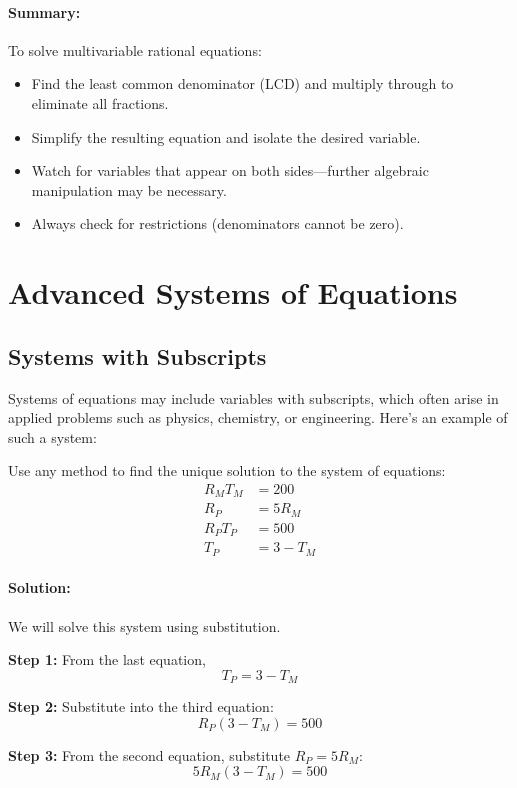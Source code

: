 \documentclass[11pt]{article}
\begin{document}
\paragraph{Summary:}
To solve multivariable rational equations:
\begin{itemize}
  \item Find the least common denominator (LCD) and multiply through to eliminate all fractions.
  \item Simplify the resulting equation and isolate the desired variable.
  \item Watch for variables that appear on both sides—further algebraic manipulation may be necessary.
  \item Always check for restrictions (denominators cannot be zero).
\end{itemize}

\section{Advanced Systems of Equations}

\subsection{Systems with Subscripts}

Systems of equations may include variables with subscripts, which often arise in applied problems such as physics, chemistry, or engineering. Here's an example of such a system:

\begin{tcolorbox}
Use any method to find the unique solution to the system of equations:
\[
\begin{aligned}
R_M T_M &= 200 \\
R_P &= 5 R_M \\
R_P T_P &= 500 \\
T_P &= 3 - T_M
\end{aligned}
\]
\end{tcolorbox}

\paragraph{Solution:}
We will solve this system using substitution.

\textbf{Step 1:} From the last equation,
\[
T_P = 3 - T_M
\]

\textbf{Step 2:} Substitute into the third equation:
\[
R_P (3 - T_M) = 500
\]

\textbf{Step 3:} From the second equation, substitute \( R_P = 5 R_M \):
\[
5 R_M (3 - T_M) = 500
\]
\end{document}
